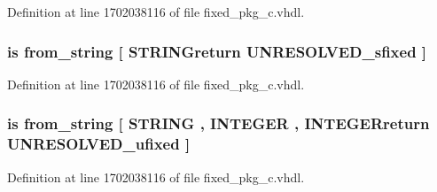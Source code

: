 Definition at line 1702038116 of file fixed\+\_\+pkg\+\_\+c.\+vhdl.

\hypertarget{classfixed__pkg_a8565828ee8a865ed84907517f2e56ed5}{}
\subsubsection[{from\+\_\+bstring}]{ {\bfseries \textcolor{keywordflow}{is}\textcolor{vhdlchar}{ }\textcolor{vhdlchar}{from\+\_\+string}\textcolor{vhdlchar}{ }\textcolor{vhdlchar}{\mbox{[}}\textcolor{vhdlchar}{ }\textcolor{vhdlchar}{S\+T\+R\+I\+N\+Greturn}\textcolor{vhdlchar}{ }{\bfseries {\bf U\+N\+R\+E\+S\+O\+L\+V\+E\+D\+\_\+sfixed}} \textcolor{vhdlchar}{ }\textcolor{vhdlchar}{\mbox{]}}\textcolor{vhdlchar}{ }} \hspace{0.3cm}{\ttfamily [Alias]}}\label{classfixed__pkg_a8565828ee8a865ed84907517f2e56ed5}


Definition at line 1702038116 of file fixed\+\_\+pkg\+\_\+c.\+vhdl.

\hypertarget{classfixed__pkg_a17bc15f81efcdd1628221ee9a0cb09d9}{}
\subsubsection[{from\+\_\+bstring}]{ {\bfseries \textcolor{keywordflow}{is}\textcolor{vhdlchar}{ }\textcolor{vhdlchar}{from\+\_\+string}\textcolor{vhdlchar}{ }\textcolor{vhdlchar}{\mbox{[}}\textcolor{vhdlchar}{ }\textcolor{comment}{S\+T\+R\+I\+N\+G}\textcolor{vhdlchar}{ }\textcolor{vhdlchar}{,}\textcolor{vhdlchar}{ }\textcolor{comment}{I\+N\+T\+E\+G\+E\+R}\textcolor{vhdlchar}{ }\textcolor{vhdlchar}{,}\textcolor{vhdlchar}{ }\textcolor{vhdlchar}{I\+N\+T\+E\+G\+E\+Rreturn}\textcolor{vhdlchar}{ }{\bfseries {\bf U\+N\+R\+E\+S\+O\+L\+V\+E\+D\+\_\+ufixed}} \textcolor{vhdlchar}{ }\textcolor{vhdlchar}{\mbox{]}}\textcolor{vhdlchar}{ }} \hspace{0.3cm}{\ttfamily [Alias]}}\label{classfixed__pkg_a17bc15f81efcdd1628221ee9a0cb09d9}


Definition at line 1702038116 of file fixed\+\_\+pkg\+\_\+c.\+vhdl.

